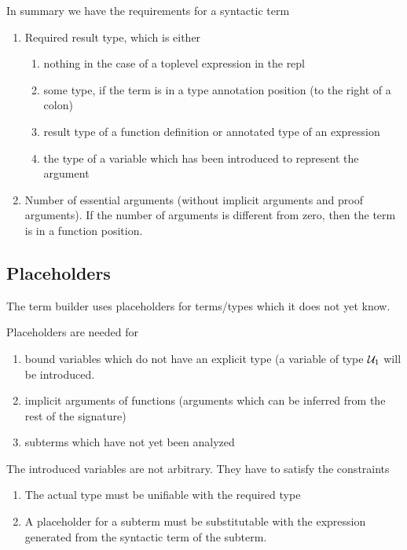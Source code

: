 \noindent In summary we have the requirements for a syntactic term
%
\begin{enumerate}

\item Required result type, which is either
  \begin{enumerate}

  \item nothing in the case of a toplevel expression in the repl

  \item some type, if the term is in a type annotation position (to the right
    of a colon)

  \item result type of a function definition or annotated type of an expression

  \item the type of a variable which has been introduced to represent the
    argument
  \end{enumerate}


\item Number of essential arguments (without implicit arguments and proof
  arguments). If the number of arguments is different from zero, then the term
  is in a function position.
\end{enumerate}





\subsection{Placeholders}

The term builder uses placeholders for terms/types which it does not yet know.

Placeholders are needed for
%
\begin{enumerate}

\item bound variables which do not have an explicit type (a variable of type
  ${\cal{U}}_1$ will be introduced.


\item implicit arguments of functions (arguments which can be inferred from
  the rest of the signature)

\item subterms which have not yet been analyzed

\end{enumerate}

The introduced variables are not arbitrary. They have to satisfy the
constraints
\begin{enumerate}
\item The actual type must be unifiable with the required type
\item A placeholder for a subterm must be substitutable with the expression
  generated from the syntactic term of the subterm.
\end{enumerate}

